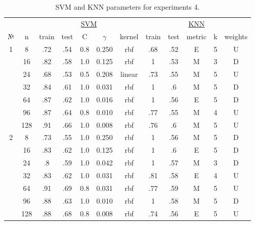 \begin{table}
\centering
\caption{SVM and KNN parameters for experiments 4.}
\label{tab:params_4_svm_knn}
\begin{tabular}{|c|c|ccccc||ccccc|}\hline
& & \multicolumn{5}{c||}{\underline{SVM}} & \multicolumn{5}{c|}{\underline{KNN}}\\
№ &   n & train & test &   C & $\gamma$ & kernel & train & test & metric & k & weights \\\hline
1 &   8 &   .72 &  .54 & 0.8 &    0.250 &    rbf &   .68 &  .52 &      E & 5 &       U \\
  &  16 &   .82 &  .58 & 1.0 &    0.125 &    rbf &     1 &  .53 &      M & 3 &       D \\
  &  24 &   .68 &  .53 & 0.5 &    0.208 & linear &   .73 &  .55 &      M & 5 &       U \\
  &  32 &   .84 &  .61 & 1.0 &    0.031 &    rbf &     1 &   .6 &      M & 5 &       D \\
  &  64 &   .87 &  .62 & 1.0 &    0.016 &    rbf &     1 &  .56 &      E & 5 &       D \\
  &  96 &   .87 &  .64 & 0.8 &    0.010 &    rbf &   .77 &  .55 &      M & 4 &       U \\
  & 128 &   .91 &  .66 & 1.0 &    0.008 &    rbf &   .76 &   .6 &      M & 5 &       U \\\hline
2 &   8 &   .73 &  .55 & 1.0 &    0.250 &    rbf &     1 &  .56 &      M & 5 &       D \\
  &  16 &   .83 &  .62 & 1.0 &    0.125 &    rbf &     1 &   .6 &      E & 5 &       D \\
  &  24 &    .8 &  .59 & 1.0 &    0.042 &    rbf &     1 &  .57 &      M & 3 &       D \\
  &  32 &   .83 &  .62 & 1.0 &    0.031 &    rbf &   .81 &  .58 &      E & 4 &       U \\
  &  64 &   .91 &  .69 & 0.8 &    0.031 &    rbf &   .77 &  .59 &      M & 5 &       U \\
  &  96 &   .88 &  .63 & 1.0 &    0.010 &    rbf &     1 &  .58 &      M & 5 &       D \\
  & 128 &   .88 &  .68 & 0.8 &    0.008 &    rbf &   .74 &  .56 &      E & 5 &       U \\\hline
\end{tabular}
\end{table}
